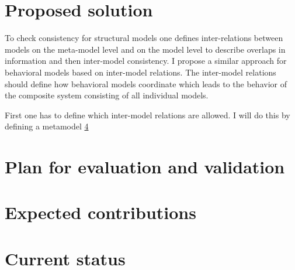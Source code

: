 \documentclass[conference]{IEEEtran}
\begin{document}
\section{Proposed solution}
To check consistency for structural models one defines inter-relations between models on the meta-model level and on the model level to describe overlaps in information \cite{stunkelMultipleModelSynchronization2020} and then inter-model consistency.
I propose a similar approach for behavioral models based on inter-model relations.
The inter-model relations should define how behavioral models coordinate which leads to the behavior of the composite system consisting of all individual models.

First one has to define which inter-model relations are allowed.
I will do this by defining a metamodel 
\ref{sec:currentStatus}


\section{Plan for evaluation and validation}

\section{Expected contributions}
\section{Current status} \label{sec:currentStatus}
\end{document}
